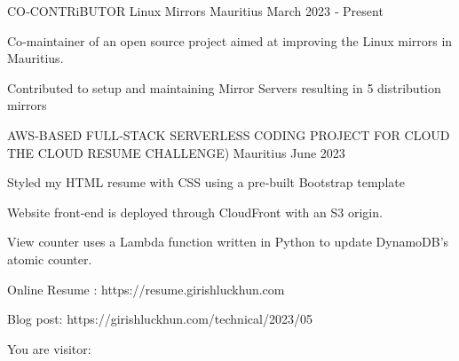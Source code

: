

\begin{cventries}

  \cventry
    {CO‑CONTRiBUTOR} %
    {Linux Mirrors} %
    {Mauritius} %
    {March 2023 ‑ Present} %
    {
      \begin{cvitems} %
        \item {Co‑maintainer of an open source project aimed at improving the Linux mirrors in Mauritius.}
        \item {Contributed to setup and maintaining Mirror Servers resulting in 5 distribution mirrors}
      \end{cvitems}
    }

  \cventry
    {AWS‑BASED FULL‑STACK SERVERLESS CODING PROJECT FOR CLOUD} %
    {THE CLOUD RESUME CHALLENGE)} %
    {Mauritius} %
    {June 2023} %
    {
      \begin{cvitems} %
        \item {Styled my HTML resume with CSS using a pre‑built Bootstrap template}
        \item {Website front‑end is deployed through CloudFront with an S3 origin.}
        \item {View counter uses a Lambda function written in Python to update DynamoDB’s atomic counter.}
        \item {Online Resume : https://resume.girishluckhun.com}
        \item {Blog post: https://girishluckhun.com/technical/2023/05}
        \item {You are visitor: }
      \end{cvitems}
    }

\end{cventries}
